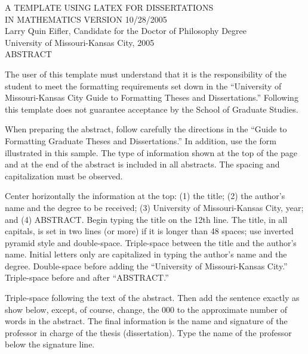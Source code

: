 %    



%
%
\setcounter{page}{2} 
%



\vspace*{20pt}

\begin{center}
\singlespace
     A  TEMPLATE USING LATEX FOR DISSERTATIONS \\[1pc]
     IN MATHEMATICS VERSION 10/28/2005 \\[2pc]

     Larry Quin Eifler, Candidate for the Doctor of Philosophy Degree\\[1pc]
     University of 
          Missouri-Kansas City, 2005 \\[2pc]
   
     ABSTRACT \\[1pc]
\end{center}

   
   The user of this template must understand that
it is the responsibility of the student to
meet the formatting requirements set down in the 
``University of Missouri-Kansas City  Guide to 
Formatting Theses and Dissertations.''
Following this  template does not guarantee
acceptance by the School of Graduate Studies. 

   When preparing the abstract, follow carefully the 
directions in the ``Guide to Formatting Graduate Theses 
and Dissertations.''
In addition, use the form illustrated in this 
sample. The type of information shown at the top of 
the page and at the end of the abstract is
included in all abstracts.  The spacing and capitalization
must be observed. 

Center horizontally the information at 
the top: (1) the title; (2) the author's name and the degree 
to be received; (3) University of Missouri-Kansas City, year; 
and (4)  {ABSTRACT}.  Begin typing the title 
on the 12th line.  The title, in all capitals, is 
set in two lines (or more) if it is longer 
than 48 spaces; use inverted pyramid style and 
double-space.  Triple-space between the title and the 
author's name.  Initial letters only are capitalized
in typing the author's name and the degree.
Double-space before adding the ``University 
of Missouri-Kansas City.'' Triple-space 
before and after ``ABSTRACT.''  

    Triple-space following the text of 
the abstract.  Then add the sentence exactly as show below, 
except, of course, change, the 000 to the approximate number 
of words in the abstract. The final information is the 
name and signature of the professor in charge of the 
thesis (dissertation).  Type the name 
of the professor below the signature line.  

